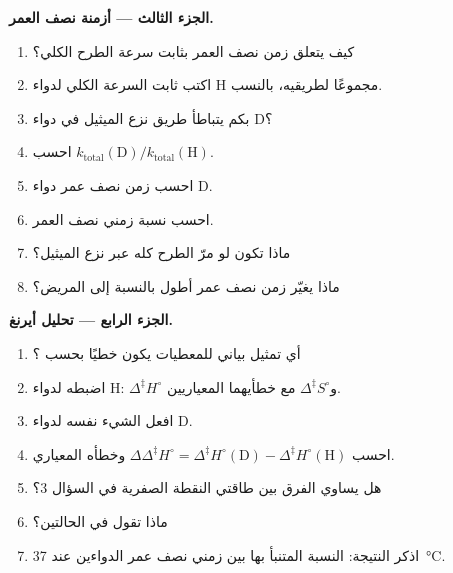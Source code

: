 \begin{problem}
\medskip\noindent\textbf{الجزء الثالث --- أزمنة نصف العمر.}
\begin{enumerate}[resume]
  \item كيف يتعلق زمن نصف العمر بثابت سرعة الطرح الكلي؟
  \item اكتب ثابت السرعة الكلي لدواء H مجموعًا لطريقيه،
        بالنسب.
  \item بكم يتباطأ طريق نزع الميثيل في دواء D؟
  \item احسب $k_{\mathrm{total}}(\mathrm D)/k_{\mathrm{total}}(\mathrm H)$.
  \item احسب زمن نصف عمر دواء D.
  \item احسب نسبة زمني نصف العمر.
  \item ماذا تكون لو مرّ الطرح كله عبر نزع الميثيل؟
  \item ماذا يغيّر زمن نصف عمر أطول بالنسبة إلى المريض؟
\end{enumerate}

\medskip\noindent\textbf{الجزء الرابع --- تحليل أيرنغ.}
\begin{enumerate}[resume]
  \item أي تمثيل بياني للمعطيات يكون خطيًا بحسب ؟
  \item اضبطه لدواء H: $\Delta^{\ddagger}H^\circ$ و$\Delta^{\ddagger}S^\circ$ مع خطأيهما المعياريين.
  \item افعل الشيء نفسه لدواء D.
  \item احسب $\Delta\Delta^{\ddagger}H^\circ = \Delta^{\ddagger}H^\circ(\mathrm D) - \Delta^{\ddagger}H^\circ(\mathrm H)$ وخطأه المعياري.
  \item هل يساوي الفرق بين طاقتي النقطة الصفرية في السؤال 3؟
  \item ماذا تقول  في الحالتين؟
  \item اذكر النتيجة: النسبة المتنبأ بها بين زمني نصف عمر الدواءين
        عند \qty{37}{\celsius}.
\end{enumerate}
\end{problem}
